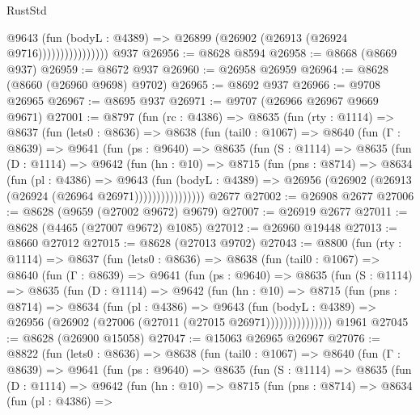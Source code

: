 \begin{lexlean}{RustStd}
\begin{coremodule}
                          @9643
                            (fun (bodyL : @4389) =>
                            @26899 (@26902 (@26913 (@26924 @9716))))))))))))))))
    @937
@26956 := @8628 @8594
@26958 := @8668 (@8669 @937)
@26959 := @8672 @937
@26960 := @26958 @26959
@26964 := @8628 (@8660 (@26960 @9698) @9702)
@26965 := @8692 @937
@26966 := @9708 @26965
@26967 := @8695 @937
@26971 := @9707 (@26966 @26967 @9669 @9671)
@27001 := @8797
    (fun (rc : @4386) =>
    @8635
      (fun (rty : @1114) =>
      @8637
        (fun (lets0 : @8636) =>
        @8638
          (fun (tail0 : @1067) =>
          @8640
            (fun (Γ : @8639) =>
            @9641
              (fun (ps : @9640) =>
              @8635
                (fun (S : @1114) =>
                @8635
                  (fun (D : @1114) =>
                  @9642
                    (fun (hn : @10) =>
                    @8715
                      (fun (pns : @8714) =>
                      @8634
                        (fun (pl : @4386) =>
                        @9643
                          (fun (bodyL : @4389) =>
                          @26956 (@26902 (@26913 (@26924 (@26964 @26971))))))))))))))))
    @2677
@27002 := @26908 @2677
@27006 := @8628 (@9659 (@27002 @9672) @9679)
@27007 := @26919 @2677
@27011 := @8628 (@4465 (@27007 @9672) @1085)
@27012 := @26960 @19448
@27013 := @8660 @27012
@27015 := @8628 (@27013 @9702)
@27043 := @8800
    (fun (rty : @1114) =>
    @8637
      (fun (lets0 : @8636) =>
      @8638
        (fun (tail0 : @1067) =>
        @8640
          (fun (Γ : @8639) =>
          @9641
            (fun (ps : @9640) =>
            @8635
              (fun (S : @1114) =>
              @8635
                (fun (D : @1114) =>
                @9642
                  (fun (hn : @10) =>
                  @8715
                    (fun (pns : @8714) =>
                    @8634
                      (fun (pl : @4386) =>
                      @9643
                        (fun (bodyL : @4389) =>
                        @26956 (@26902 (@27006 (@27011 (@27015 @26971)))))))))))))))
    @1961
@27045 := @8628 (@26900 @15058)
@27047 := @15063 @26965 @26967
@27076 := @8822
    (fun (lets0 : @8636) =>
    @8638
      (fun (tail0 : @1067) =>
      @8640
        (fun (Γ : @8639) =>
        @9641
          (fun (ps : @9640) =>
          @8635
            (fun (S : @1114) =>
            @8635
              (fun (D : @1114) =>
              @9642
                (fun (hn : @10) =>
                @8715
                  (fun (pns : @8714) =>
                  @8634
                    (fun (pl : @4386) =>

\end{coremodule}
\end{lexlean}
